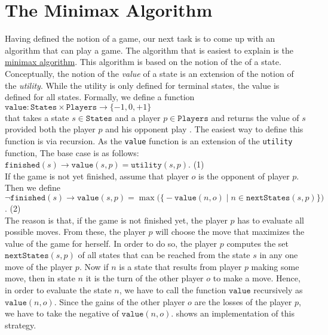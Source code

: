 \section{The Minimax Algorithm \label{sec:minimax}}
Having defined the notion of a game, our next task is to come up with an algorithm that can play a game.  The
algorithm that is easiest to explain is the \href{https://en.wikipedia.org/wiki/Minimax}{minimax algorithm}.  This
algorithm is based on the notion of the  of a state.  Conceptually, the notion of the \emph{value}
of a state is an extension of the notion of the \emph{utility}.  While the utility is only defined for terminal
states, the value is defined for all states.  Formally, we define a function
\\[0.2cm]
\hspace*{1.3cm}
$\texttt{value}: \texttt{States} \times \texttt{Players} \rightarrow \{-1, 0, +1\}$
\\[0.2cm]
that takes a state $s \in \texttt{States}$ and a player $p \in \texttt{Players}$ and returns the value of $s$ provided both the player $p$ and his
opponent play .  The easiest way to define this function is via recursion.  As the
\texttt{value} function is an extension of the \texttt{utility} function, The base case is as follows:
\\[0.2cm]
\hspace*{1.3cm}
$\texttt{finished}(s) \rightarrow \texttt{value}(s, p) = \texttt{utility}(s, p)$. \hspace*{\fill} (1)
\\[0.2cm]
If the game is not yet finished, assume that player $o$ is the opponent of player $p$.  Then we define
\\[0.2cm]
\hspace*{1.3cm}
$\neg \texttt{finished}(s) \rightarrow 
 \texttt{value}(s, p) = \max\bigl(\bigl\{
                     -\texttt{value}(n, o) \mid n \in \texttt{nextStates}(s, p)
                     \bigr\}\bigr)
$.  \hspace*{\fill} (2)
\\[0.2cm]
The reason is that, if the game is not finished yet, the player $p$ has to evaluate all possible moves.  
From these, the player $p$ will choose the move that maximizes the value of the game for herself.  In order to
do so, the player $p$ computes the set 
$\texttt{nextStates}(s, p)$ of all states that can be reached from the state $s$ in any one move of the player $p$.
Now if $n$ is a state that results from player $p$ making some move, then in state $n$ it is the turn of the other player
$o$ to make a move.  Hence, in order to evaluate the state $n$, we have to call the function $\texttt{value}$
recursively as $\texttt{value}(n,o)$.   Since the gains of the other player $o$ are the losses of the player
$p$, we have to take the negative of  $\texttt{value}(n, o)$.
 shows an implementation of this strategy.


